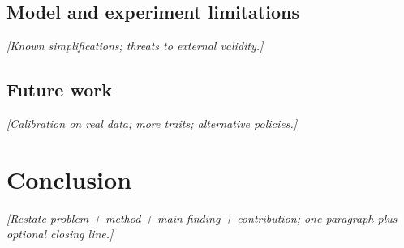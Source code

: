 \subsection{Model and experiment limitations}
\textit{[Known simplifications; threats to external validity.]}

\subsection{Future work}
\textit{[Calibration on real data; more traits; alternative policies.]}

\section{Conclusion}
\label{sec:conclusao}

\textit{[Restate problem + method + main finding + contribution; one paragraph plus optional closing line.]}
